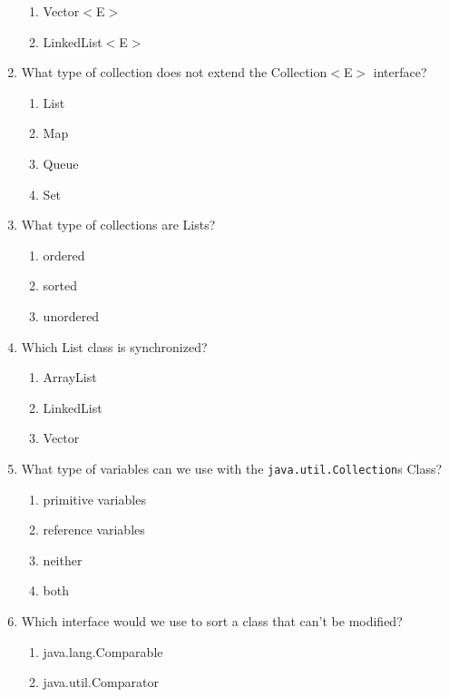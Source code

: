 \documentclass[11pt,a4paper]{article}
\begin{document}
\begin{enumerate}
\begin{enumerate}
    	\item Vector$<$E$>$
    	\item LinkedList$<$E$>$
    \end{enumerate}
    \item What type of collection does not extend the Collection$<$E$>$ interface?
    \begin{enumerate}
    	\item List
    	\item Map
    	\item Queue
    	\item Set
    \end{enumerate}
    \item What type of collections are Lists?
    \begin{enumerate}
    	\item ordered
    	\item sorted
    	\item unordered
    \end{enumerate}
    \item  Which List class is synchronized?
    \begin{enumerate}
    	\item ArrayList
    	\item LinkedList
    	\item Vector
    \end{enumerate}
    \item What type of variables can we use with the \texttt{java.util.Collection}s Class?
    \begin{enumerate}
    	\item primitive variables
    	\item reference variables
    	\item neither
    	\item both
    \end{enumerate}
    \item  Which interface would we use to sort a class that can't be modified?
    \begin{enumerate}
    	\item java.lang.Comparable
    	\item java.util.Comparator
    \end{enumerate}
\end{enumerate}
\end{document}
